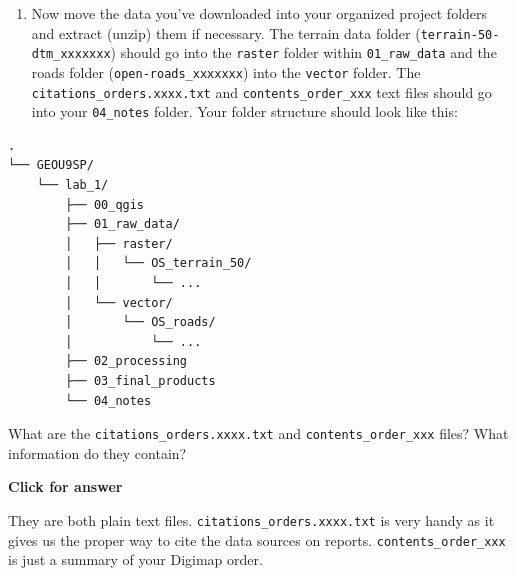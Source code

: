 \documentclass[
  letterpaper,
  DIV=11,
  numbers=noendperiod]{scrreprt}
\providecommand{\tightlist}{%
  \setlength{\itemsep}{0pt}\setlength{\parskip}{0pt}}\usepackage{longtable,booktabs,array}
\begin{document}
\begin{enumerate}
\def\labelenumi{(\arabic{enumi})}
\setcounter{enumi}{6}
\tightlist
\item
  Now move the data you've downloaded into your organized project
  folders and extract (unzip) them if necessary. The terrain data folder
  (\texttt{terrain-50-dtm\_xxxxxxx}) should go into the \texttt{raster}
  folder within \texttt{01\_raw\_data} and the roads folder
  (\texttt{open-roads\_xxxxxxx}) into the \texttt{vector} folder. The
  \texttt{citations\_orders.xxxx.txt} and \texttt{contents\_order\_xxx}
  text files should go into your \texttt{04\_notes} folder. Your folder
  structure should look like this:
\end{enumerate}

\begin{verbatim}
.
└── GEOU9SP/
    └── lab_1/
        ├── 00_qgis
        ├── 01_raw_data/
        │   ├── raster/
        │   │   └── OS_terrain_50/
        │   │       └── ...
        │   └── vector/
        │       └── OS_roads/
        │           └── ...
        ├── 02_processing
        ├── 03_final_products
        └── 04_notes
\end{verbatim}

\begin{tcolorbox}[enhanced jigsaw, coltitle=black, toprule=.15mm, breakable, opacitybacktitle=0.6, left=2mm, colback=white, leftrule=.75mm, rightrule=.15mm, colbacktitle=quarto-callout-important-color!10!white, toptitle=1mm, titlerule=0mm, colframe=quarto-callout-important-color-frame, arc=.35mm, bottomtitle=1mm, opacityback=0, bottomrule=.15mm, title=\textcolor{quarto-callout-important-color}{\faExclamation}\hspace{0.5em}{Stop and Think}]

What are the \texttt{citations\_orders.xxxx.txt} and
\texttt{contents\_order\_xxx} files? What information do they contain?

\end{tcolorbox}

\begin{tcolorbox}[enhanced jigsaw, toprule=.15mm, breakable, left=2mm, colframe=quarto-callout-important-color-frame, colback=white, arc=.35mm, leftrule=.75mm, opacityback=0, rightrule=.15mm, bottomrule=.15mm]

\vspace{-3mm}\textbf{Click for answer}\vspace{3mm}

They are both plain text files. \texttt{citations\_orders.xxxx.txt} is
very handy as it gives us the proper way to cite the data sources on
reports. \texttt{contents\_order\_xxx} is just a summary of your Digimap
order.

\end{tcolorbox}
\end{document}
